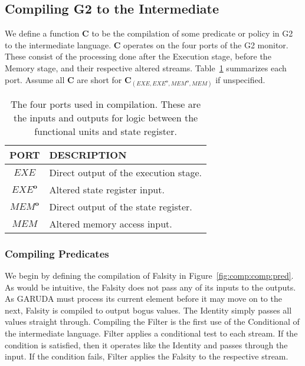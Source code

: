 \documentclass[sigconf,usenames,dvipsnames,svgnames,table]{acmart}
\newcommand{\obf}[1]{#1^\mathbf{o}}
\def \sysname {\textsc{G2}\xspace}
\def \oldname {\textsc{GARUDA}\xspace}
\begin{document}
    \subsection{Compiling \sysname to the Intermediate}\label{sec:comp:comp}
      We define a function $\mathbf{C}$ to be the compilation of some predicate or policy in \sysname to the intermediate language.
      $\mathbf{C}$ operates on the four ports of the \sysname monitor.
      These consist of the processing done after the Execution stage, before the Memory stage, and their respective altered streams.
      Table~\ref{tab:comp:comp:ports} summarizes each port.
      Assume all $\mathbf{C}$ are short for $\mathbf{C}_{(EXE,\obf{EXE},\obf{MEM},MEM)}$ if unspecified.
      \begin{table}
        \centering
        \begin{tabular}{c | l}
          PORT        & DESCRIPTION \\ \hline
          $EXE$       & Direct output of the execution stage. \\
          $\obf{EXE}$ & Altered state register input. \\
          $\obf{MEM}$ & Direct output of the state register. \\
          $MEM$       & Altered memory access input. 
        \end{tabular}
        \caption{
          The four ports used in compilation.
          These are the inputs and outputs for logic between the functional units and state register.
        }
        \label{tab:comp:comp:ports}
      \end{table}

      \subsubsection{Compiling Predicates}\label{sec:comp:comp:pred}
        We begin by defining the compilation of Falsity in Figure~\ref{fig:comp:comp:pred}.
        As would be intuitive, the Falsity does not pass any of its inputs to the outputs.
        As \oldname must process its current element before it may move on to the next, Falsity is compiled to output bogus values.
        The Identity simply passes all values straight through.
        Compiling the Filter is the first use of the Conditional of the intermediate language.
        Filter applies a conditional test to each stream.
        If the condition is satisfied, then it operates like the Identity and passes through the input.
        If the condition fails, Filter applies the Falsity to the respective stream.
        \par
\end{document}
